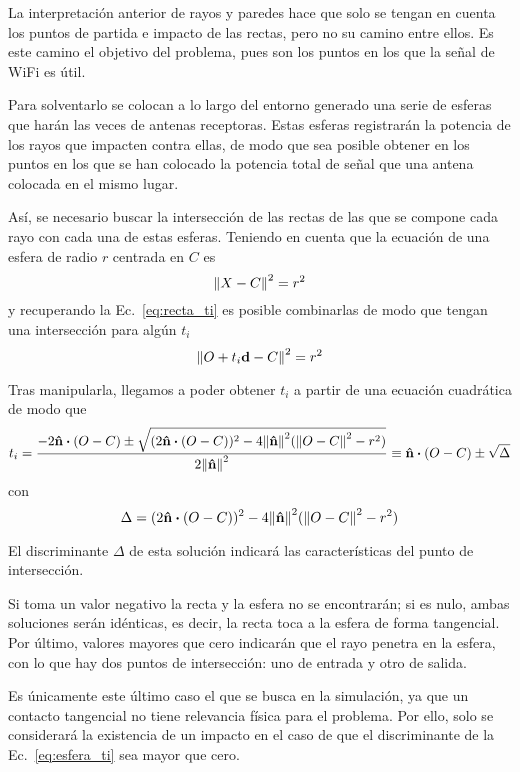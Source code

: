 La interpretación anterior de rayos y paredes hace que solo se tengan en cuenta los puntos de partida e impacto de las rectas, pero no su camino entre ellos.
Es este camino el objetivo del problema, pues son los puntos en los que la señal de WiFi es útil.

Para solventarlo se colocan a lo largo del entorno generado una serie de esferas que harán las veces de antenas receptoras.
Estas esferas registrarán la potencia de los rayos que impacten contra ellas, de modo que sea posible obtener en los puntos en los que se han colocado la potencia total de señal que una antena colocada en el mismo lugar.

Así, se necesario buscar la intersección de las rectas de las que se compone cada rayo con cada una de estas esferas.
Teniendo en cuenta que la ecuación de una esfera de radio $r$ centrada en $C$ es 
\begin{equation}
    \label{eq:esfera}
    \norm{X-C}^2 = r^2
\end{equation}
y recuperando la Ec.~\eqref{eq:recta_ti} es posible combinarlas de modo que tengan una intersección para algún $t_i$
\begin{equation}
    \norm{O + t_i\vb{d} -C}^2 = r^2
\end{equation}

Tras manipularla, llegamos a poder obtener $t_i$ a partir de una ecuación cuadrática de modo que
\begin{equation}
    \label{eq:esfera_ti}
    t_i = \frac{-2\vu{n}\vdot(O - C) \pm \sqrt{(2\vu{n}\vdot(O - C))^2 - 4\norm{\vu{n}}^2(\norm{O-C}^2-r^2)}}{2\norm{\vu{n}}^2} \equiv \vu{n}\vdot(O - C) \pm \sqrt{\Delta}
\end{equation}
con 
\begin{equation}
    \Delta = (2\vu{n}\vdot(O - C))^2 - 4\norm{\vu{n}}^2(\norm{O-C}^2-r^2)
\end{equation}

El discriminante $\Delta$ de esta solución indicará las características del punto de intersección.

Si toma un valor negativo la recta y la esfera no se encontrarán; si es nulo, ambas soluciones serán idénticas, es decir, la recta toca a la esfera de forma tangencial.
Por último, valores mayores que cero indicarán que el rayo penetra en la esfera, con lo que hay dos puntos de intersección: uno de entrada y otro de salida.

Es únicamente este último caso el que se busca en la simulación, ya que un contacto tangencial no tiene relevancia física para el problema.
Por ello, solo se considerará la existencia de un impacto en el caso de que el discriminante de la Ec.~\eqref{eq:esfera_ti} sea mayor que cero.

